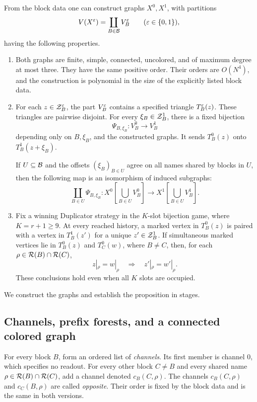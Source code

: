 \begin{proposition}
\label{prop:subcubic-realization}
From the block data one can construct graphs \(X^0,X^1\), with
partitions
\[
  V(X^\varepsilon)=\coprod_{B\in\mathcal B}V_B^\varepsilon
  \qquad(\varepsilon\in\{0,1\}),
\]
having the following properties.
\begin{enumerate}
\item
Both graphs are finite, simple, connected, uncolored, and of maximum
degree at most three.  They have the same positive order.
Their orders are \(O(N^4)\), and the construction is polynomial in the
size of the explicitly listed block data.
\item
For each \(z\in\mathcal Z_B^\varepsilon\), the part \(V_B^\varepsilon\) contains a specified
triangle \(T_B^\varepsilon(z)\).  These triangles are pairwise disjoint.
For every \(\xi_B\in\mathcal Z_B^1\), there is a fixed bijection
\[
  \Psi_{B,\xi_B}:V_B^0\longrightarrow V_B^1
\]
depending only on \(B,\xi_B\), and the constructed graphs.  It sends
\(T_B^0(z)\) onto \(T_B^1(z+\xi_B)\).
\par{}
If \(U\subseteq\mathcal B\) and the offsets
\((\xi_B)_{B\in U}\) agree on all names shared by blocks in \(U\), then
the following map is an isomorphism of induced subgraphs:
\[
 \coprod_{B\in U}\Psi_{B,\xi_B}:
 X^0\left[\bigcup_{B\in U}V_B^0\right]
 \longrightarrow
 X^1\left[\bigcup_{B\in U}V_B^1\right].
\]
\item
Fix a winning Duplicator strategy in the \(K\)-slot bijection game,
where \(K=r+1\ge9\).
At every reached history, a marked vertex in \(T_B^0(z)\) is paired
with a vertex in \(T_B^1(z')\) for a unique \(z'\in\mathcal Z_B^1\).
If simultaneous marked vertices lie in \(T_B^0(z)\) and \(T_C^0(w)\),
where \(B\ne C\), then, for each
\(\rho\in\mathcal R(B)\cap\mathcal R(C)\),
\[
     z|_\rho=w|_\rho
     \quad\Longrightarrow\quad
     z'|_\rho=w'|_\rho .
\]
These conclusions hold even when all \(K\) slots are occupied.
\end{enumerate}
\end{proposition}

We construct the graphs and establish the proposition in stages.

\subsection{Channels, prefix forests, and a connected colored graph}

For every block \(B\), form an ordered list of \emph{channels}.
Its first member is channel \(0\), which specifies no readout.
For every other block \(C\ne B\) and every shared name
\(\rho\in\mathcal R(B)\cap\mathcal R(C)\), add a channel denoted
\(c_B(C,\rho)\).
The channels \(c_B(C,\rho)\) and \(c_C(B,\rho)\) are called
\emph{opposite}.  Their order is fixed by the block data and is the
same in both versions.

